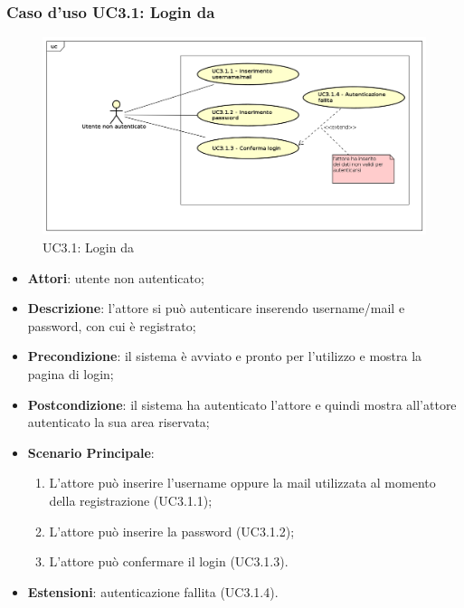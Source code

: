 \subsubsection{Caso d'uso UC3.1: Login da \progetto}
\label{UC3.1}
\begin{figure}
	\centering
	\includegraphics[scale=0.5]{UML/UC3_1.png}
	\caption{UC3.1: Login da \progetto}
\end{figure}
\FloatBarrier
\begin{itemize}
	\item \textbf{Attori}: utente non autenticato;
	\item \textbf{Descrizione}: l'attore si può autenticare inserendo username/mail e password, con cui è registrato;
	\item \textbf{Precondizione}: il sistema è avviato e pronto per l'utilizzo e mostra la pagina di login;
	\item \textbf{Postcondizione}: il sistema ha autenticato l'attore e quindi mostra all'attore autenticato la sua area riservata;
	\item \textbf{Scenario Principale}:
	\begin{enumerate}
		\item L'attore può inserire l'username oppure la mail utilizzata al momento della registrazione (UC3.1.1);
		\item L'attore può inserire la password (UC3.1.2);
		\item L'attore può confermare il login (UC3.1.3).
	\end{enumerate}
	\item \textbf{Estensioni}: autenticazione fallita (UC3.1.4).
\end{itemize}

